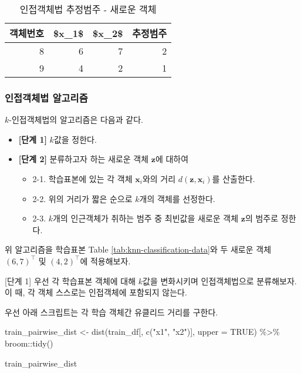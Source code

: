 \documentclass[
]{book}
\newenvironment{Shaded}{\begin{snugshade}}{\end{snugshade}}
\newcommand{\AttributeTok}[1]{\textcolor[rgb]{0.77,0.63,0.00}{#1}}
\newcommand{\ConstantTok}[1]{\textcolor[rgb]{0.00,0.00,0.00}{#1}}
\newcommand{\FunctionTok}[1]{\textcolor[rgb]{0.00,0.00,0.00}{#1}}
\newcommand{\NormalTok}[1]{#1}
\newcommand{\OtherTok}[1]{\textcolor[rgb]{0.56,0.35,0.01}{#1}}
\newcommand{\SpecialCharTok}[1]{\textcolor[rgb]{0.00,0.00,0.00}{#1}}
\newcommand{\StringTok}[1]{\textcolor[rgb]{0.31,0.60,0.02}{#1}}
\providecommand{\tightlist}{%
  \setlength{\itemsep}{0pt}\setlength{\parskip}{0pt}}
\begin{document}
\begin{table}

\caption{\label{tab:knn-classification-test}인접객체법 추정범주 - 새로운 객체}
\centering
\begin{tabular}[t]{rrrr}
\toprule
객체번호 & \$x\_1\$ & \$x\_2\$ & 추정범주\\
\midrule
8 & 6 & 7 & 2\\
9 & 4 & 2 & 1\\
\bottomrule
\end{tabular}
\end{table}

\hypertarget{nearest-neighbor-classification-algorithm}{%
\subsubsection{인접객체법 알고리즘}\label{nearest-neighbor-classification-algorithm}}

\(k\)-인접객체법의 알고리즘은 다음과 같다.

\begin{itemize}
\tightlist
\item
  \textbf{{[}단계 1{]}} \(k\)값을 정한다.
\item
  \textbf{{[}단계 2{]}} 분류하고자 하는 새로운 객체 \(\mathbf{z}\)에 대하여

  \begin{itemize}
  \tightlist
  \item
    2-1. 학습표본에 있는 각 객체 \(\mathbf{x}_i\)와의 거리 \(d(\mathbf{z}, \mathbf{x}_i)\)를 산출한다.
  \item
    2-2. 위의 거리가 짧은 순으로 \(k\)개의 객체를 선정한다.
  \item
    2-3. \(k\)개의 인근객체가 취하는 범주 중 최빈값을 새로운 객체 \(\mathbf{z}\)의 범주로 정한다.
  \end{itemize}
\end{itemize}

위 알고리즘을 학습표본 Table \ref{tab:knn-classification-data}와 두 새로운 객체 \((6, 7)^\top\) 및 \((4, 2)^\top\)에 적용해보자.

{[}단계 1{]} 우선 각 학습표본 객체에 대해 \(k\)값을 변화시키며 인접객체법으로 분류해보자. 이 때, 각 객체 스스로는 인접객체에 포함되지 않는다.

우선 아래 스크립트는 각 학습 객체간 유클리드 거리를 구한다.

\begin{Shaded}
\begin{Highlighting}[]
\NormalTok{train\_pairwise\_dist }\OtherTok{\textless{}{-}} \FunctionTok{dist}\NormalTok{(train\_df[, }\FunctionTok{c}\NormalTok{(}\StringTok{"x1"}\NormalTok{, }\StringTok{"x2"}\NormalTok{)], }\AttributeTok{upper =} \ConstantTok{TRUE}\NormalTok{) }\SpecialCharTok{\%\textgreater{}\%}
\NormalTok{  broom}\SpecialCharTok{::}\FunctionTok{tidy}\NormalTok{()}

\NormalTok{train\_pairwise\_dist}
\end{Highlighting}
\end{Shaded}
\end{document}
